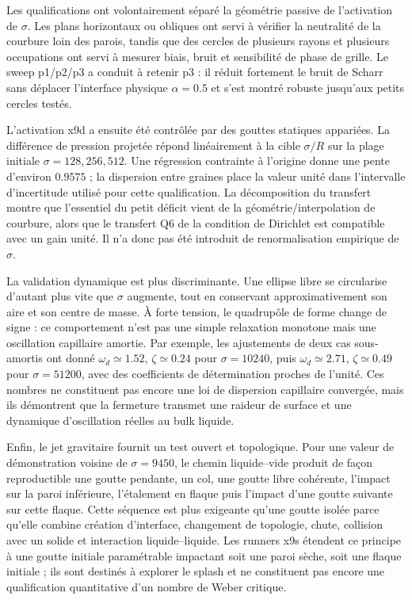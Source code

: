 \documentclass[11pt,a4paper]{article}
\begin{document}
Les qualifications ont volontairement séparé la géométrie passive de l'activation de $\sigma$. Les plans horizontaux ou obliques ont servi à vérifier la neutralité de la courbure loin des parois, tandis que des cercles de plusieurs rayons et plusieurs occupations ont servi à mesurer biais, bruit et sensibilité de phase de grille. Le sweep p1/p2/p3 a conduit à retenir p3 : il réduit fortement le bruit de Scharr sans déplacer l'interface physique $\alpha=0.5$ et s'est montré robuste jusqu'aux petits cercles testés.

L'activation x9d a ensuite été contrôlée par des gouttes statiques appariées. La différence de pression projetée répond linéairement à la cible $\sigma/R$ sur la plage initiale $\sigma=128,256,512$. Une régression contrainte à l'origine donne une pente d'environ $0.9575$ ; la dispersion entre graines place la valeur unité dans l'intervalle d'incertitude utilisé pour cette qualification. La décomposition du transfert montre que l'essentiel du petit déficit vient de la géométrie/interpolation de courbure, alors que le transfert Q6 de la condition de Dirichlet est compatible avec un gain unité. Il n'a donc pas été introduit de renormalisation empirique de $\sigma$.

La validation dynamique est plus discriminante. Une ellipse libre se circularise d'autant plus vite que $\sigma$ augmente, tout en conservant approximativement son aire et son centre de masse. À forte tension, le quadrupôle de forme change de signe : ce comportement n'est pas une simple relaxation monotone mais une oscillation capillaire amortie. Par exemple, les ajustements de deux cas sous-amortis ont donné $\omega_d\simeq1.52$, $\zeta\simeq0.24$ pour $\sigma=10240$, puis $\omega_d\simeq2.71$, $\zeta\simeq0.49$ pour $\sigma=51200$, avec des coefficients de détermination proches de l'unité. Ces nombres ne constituent pas encore une loi de dispersion capillaire convergée, mais ils démontrent que la fermeture transmet une raideur de surface et une dynamique d'oscillation réelles au bulk liquide.

Enfin, le jet gravitaire fournit un test ouvert et topologique. Pour une valeur de démonstration voisine de $\sigma=9450$, le chemin liquide--vide produit de façon reproductible une goutte pendante, un col, une goutte libre cohérente, l'impact sur la paroi inférieure, l'étalement en flaque puis l'impact d'une goutte suivante sur cette flaque. Cette séquence est plus exigeante qu'une goutte isolée parce qu'elle combine création d'interface, changement de topologie, chute, collision avec un solide et interaction liquide--liquide. Les runners x9s étendent ce principe à une goutte initiale paramétrable impactant soit une paroi sèche, soit une flaque initiale ; ils sont destinés à explorer le splash et ne constituent pas encore une qualification quantitative d'un nombre de Weber critique.
\end{document}
